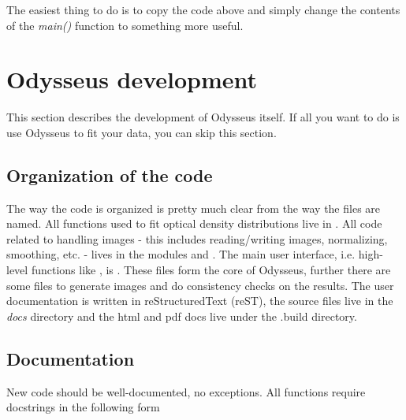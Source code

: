 \documentclass[letterpaper,10pt,english]{manual}
\begin{document}
The easiest thing to do is to copy the code above and simply change the contents
of the \emph{main()} function to something more useful.

\resetcurrentobjects


\section{Odysseus development}

This section describes the development of Odysseus itself. If all you want to do is use Odysseus to fit your data, you can skip this section.


\subsection{Organization of the code}

The way the code is organized is pretty much clear from the way the files are named. All functions used to fit optical density distributions live in \hyperlink{module-fitfuncs}{}. All code related to handling images - this includes reading/writing images, normalizing, smoothing, etc. - lives in the modules \hyperlink{module-imageio}{} and \hyperlink{module-imageprocess}{}. The main user interface, i.e. high-level functions like \hyperlink{fitfermions.fit_img}{}, is \hyperlink{module-fitfermions}{}. These files form the core of Odysseus, further there are some files to generate images and do consistency checks on the results. The user documentation is written in reStructuredText (reST), the source files live in the \emph{docs} directory and the html and pdf docs live under the .build directory.


\subsection{Documentation}

New code should be well-documented, no exceptions. All functions require docstrings in the following form
\end{document}
